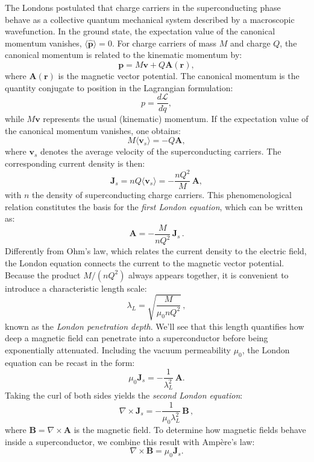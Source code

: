 The Londons postulated that charge carriers in the superconducting phase behave as a collective quantum mechanical system described by a macroscopic wavefunction. 
In the ground state, the expectation value of the canonical momentum vanishes, \( \langle \hat{\mathbf{p}} \rangle = 0 \). 
For charge carriers of mass \( M \) and charge \( Q \), the canonical momentum is related to the kinematic momentum by:
\[
    \mathbf{p} = M\mathbf{v} + Q\mathbf{A}(\mathbf{r}),
\]
where \( \mathbf{A}(\mathbf{r}) \) is the magnetic vector potential. 
The canonical momentum is the quantity conjugate to position in the Lagrangian formulation:
\[
    p = \frac{d \mathcal{L}}{d \dot{q}},
\]
while \( M\mathbf{v} \) represents the usual (kinematic) momentum. 
If the expectation value of the canonical momentum vanishes, one obtains:
\[
    M \langle \mathbf{v}_s \rangle = -Q \mathbf{A},
\]
where \( \mathbf{v}_s \) denotes the average velocity of the superconducting carriers. 
The corresponding current density is then:
\begin{equation}
    \mathbf{J}_s = n Q \langle \mathbf{v}_s \rangle = -\frac{n Q^2}{M}\,\mathbf{A},
    \label{000}
\end{equation}
with \( n \) the density of superconducting charge carriers. 
This phenomenological relation constitutes the basis for the \textit{first London equation}, which can be written as:
\begin{equation}
\boxed{
    \mathbf{A} = -\frac{M}{nQ^2}\, \mathbf{J}_s
    }\,.
\end{equation}
Differently from Ohm’s law, which relates the current density to the electric field, the London equation connects the current to the magnetic vector potential.
Because the product \( M / (n Q^2) \) always appears together, it is convenient to introduce a characteristic length scale:
\begin{equation}
\boxed{
    \lambda_L = \sqrt{\frac{M}{\mu_0 n Q^2}}}\, ,
\end{equation}
known as the \textit{London penetration depth}. We'll see that this length quantifies how deep a magnetic field can penetrate into a superconductor before being exponentially attenuated. 
Including the vacuum permeability \( \mu_0 \), the London equation can be recast in the form:
\[
    \mu_0 \mathbf{J}_s = -\frac{1}{\lambda_L^2}\, \mathbf{A}.
\]
Taking the curl of both sides yields the \textit{second London equation}:
\begin{equation}
\boxed{
    \nabla \times \mathbf{J}_s = -\frac{1}{\mu_0 \lambda_L^2}\, \mathbf{B}}\, ,
\end{equation}
where \( \mathbf{B} = \nabla \times \mathbf{A} \) is the magnetic field.
To determine how magnetic fields behave inside a superconductor, we combine this result with Ampère’s law:
\[
    \nabla \times \mathbf{B} = \mu_0 \mathbf{J}_s.
\]

